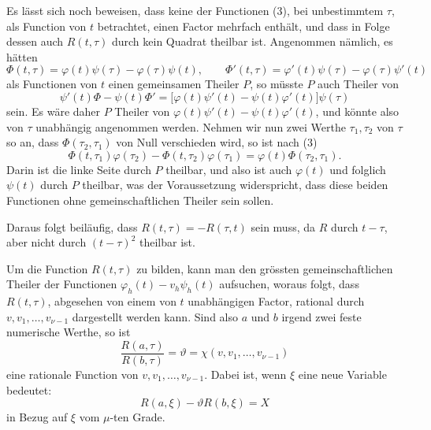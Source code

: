 \documentclass[11pt]{article}
\begin{document}
Es lässt sich noch beweisen, dass keine der Functionen (3), bei unbestimmtem \(\tau\), als Function von \(t\) betrachtet, einen Factor mehrfach enthält, und dass in Folge dessen auch \(R(t,\tau)\) durch kein Quadrat theilbar ist. Angenommen nämlich, es hätten
\[
\Phi(t,\tau)=\varphi(t)\psi(\tau)-\varphi(\tau)\psi(t),
\qquad
\Phi'(t,\tau)=\varphi'(t)\psi(\tau)-\varphi(\tau)\psi'(t)
\]
als Functionen von \(t\) einen gemeinsamen Theiler \(P\), so müsste \(P\) auch Theiler von
\[
\psi'(t)\Phi-\psi(t)\Phi'
=
\bigl[\varphi(t)\psi'(t)-\psi(t)\varphi'(t)\bigr]\psi(\tau)
\]
sein. Es wäre daher \(P\) Theiler von \(\varphi(t)\psi'(t)-\psi(t)\varphi'(t)\), und könnte also von \(\tau\) unabhängig angenommen werden. Nehmen wir nun zwei Werthe \(\tau_1,\tau_2\) von \(\tau\) so an, dass \(\Phi(\tau_2,\tau_1)\) von Null verschieden wird, so ist nach (3)
\[
\Phi(t,\tau_1)\varphi(\tau_2)-\Phi(t,\tau_2)\varphi(\tau_1)
=
\varphi(t)\Phi(\tau_2,\tau_1).
\]
Darin ist die linke Seite durch \(P\) theilbar, und also ist auch \(\varphi(t)\) und folglich \(\psi(t)\) durch \(P\) theilbar, was der Voraussetzung widerspricht, dass diese beiden Functionen ohne gemeinschaftlichen Theiler sein sollen.

Daraus folgt beiläufig, dass \(R(t,\tau)=-R(\tau,t)\) sein muss, da \(R\) durch \(t-\tau\), aber nicht durch \((t-\tau)^2\) theilbar ist.

Um die Function \(R(t,\tau)\) zu bilden, kann man den grössten gemeinschaftlichen Theiler der Functionen \(\varphi_h(t)-v_h\psi_h(t)\) aufsuchen, woraus folgt, dass \(R(t,\tau)\), abgesehen von einem von \(t\) unabhängigen Factor, rational durch \(v,v_1,\ldots,v_{\nu-1}\) dargestellt werden kann. Sind also \(a\) und \(b\) irgend zwei feste numerische Werthe, so ist
\begin{equation}
\frac{R(a,\tau)}{R(b,\tau)}
=\vartheta
=
\chi(v,v_1,\ldots,v_{\nu-1})
\tag{5}
\end{equation}
eine rationale Function von \(v,v_1,\ldots,v_{\nu-1}\). Dabei ist, wenn \(\xi\) eine neue Variable bedeutet:
\begin{equation}
R(a,\xi)-\vartheta R(b,\xi)=X
\tag{6}
\end{equation}
in Bezug auf \(\xi\) vom \(\mu\)-ten Grade.
\end{document}
